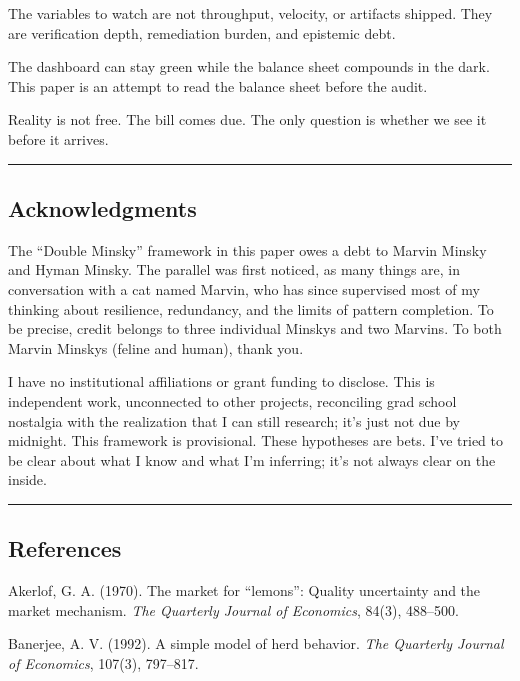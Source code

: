 \documentclass[11pt,a4paper]{article}
\begin{document}
The variables to watch are not throughput, velocity, or artifacts shipped. They are verification depth, remediation burden, and epistemic debt.

The dashboard can stay green while the balance sheet compounds in the dark. This paper is an attempt to read the balance sheet before the audit.

Reality is not free. The bill comes due. The only question is whether we see it before it arrives.

\begin{center}\rule{0.5\linewidth}{0.5pt}\end{center}

\hypertarget{acknowledgments}{%
\subsection{Acknowledgments}\label{acknowledgments}}

The ``Double Minsky'' framework in this paper owes a debt to Marvin Minsky and Hyman Minsky. The parallel was first noticed, as many things are, in conversation with a cat named Marvin, who has since supervised most of my thinking about resilience, redundancy, and the limits of pattern completion. To be precise, credit belongs to three individual Minskys and two Marvins. To both Marvin Minskys (feline and human), thank you.

I have no institutional affiliations or grant funding to disclose. This is independent work, unconnected to other projects, reconciling grad school nostalgia with the realization that I can still research; it's just not due by midnight. This framework is provisional. These hypotheses are bets. I've tried to be clear about what I know and what I'm inferring; it's not always clear on the inside.

\begin{center}\rule{0.5\linewidth}{0.5pt}\end{center}

\hypertarget{references}{%
\subsection{References}\label{references}}

Akerlof, G. A. (1970). The market for ``lemons'': Quality uncertainty and the market mechanism. \emph{The Quarterly Journal of Economics}, 84(3), 488--500.

Banerjee, A. V. (1992). A simple model of herd behavior. \emph{The Quarterly Journal of Economics}, 107(3), 797--817.
\end{document}
